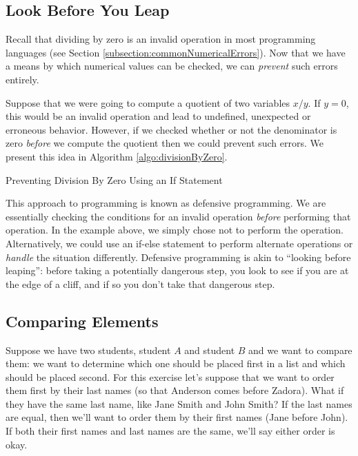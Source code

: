 \subsection{Look Before You Leap}

Recall that dividing by zero is an invalid operation in most programming languages 
(see Section \ref{subsection:commonNumericalErrors}).  Now that we have a means by
which numerical values can be checked, we can \emph{prevent} such errors
entirely.  

Suppose that we were going to compute a quotient of two variables $x / y$.  If $y = 0$, this
would be an invalid operation and lead to undefined, unexpected or erroneous behavior.  
However, if we checked whether or not the denominator is zero \emph{before} we compute
the quotient then we could prevent such errors.  We present this idea in Algorithm \ref{algo:divisionByZero}.

\begin{algorithm}[H]
\caption{Preventing Division By Zero Using an If Statement}
\label{algo:divisionByZero}
\end{algorithm}

This approach to programming is known as 
\gls{defensive programming}.  We are essentially
checking the conditions for an invalid operation \emph{before} performing that operation.  
In the example above, we simply chose not to perform the operation.  Alternatively, we could
use an if-else statement to perform alternate operations or \emph{handle} the situation
differently.  Defensive programming is akin to ``looking before leaping'': before taking a potentially dangerous step, you look to see if you are at the edge of a cliff, and if so you 
don't take that dangerous step.

%

\subsection{Comparing Elements}

Suppose we have two students, student $A$ and student $B$ and we want to compare 
them: we want to determine which one should be placed first in a list and which should
be placed second.  For this exercise let's suppose that we want to order them first by
their last names (so that Anderson comes before Zadora).  What if they have the same
last name, like Jane Smith and John Smith?  If the last names are equal, then we'll want
to order them by their first names (Jane before John).  If both their first names and last
names are the same, we'll say either order is okay.

